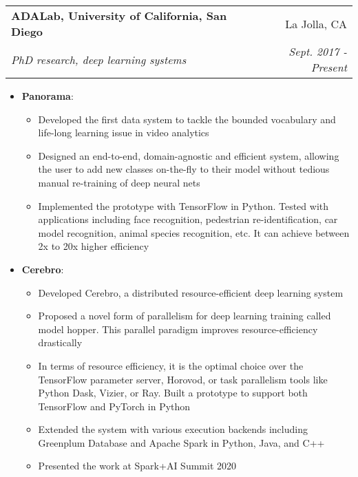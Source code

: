 \documentclass[letterpaper,11pt]{article}
\makeatletter
\newcommand{\resumeItem}[2]{
 \item\small{
  \textbf{#1}{: #2 \vspace{-2pt}}
 }
}
\newcommand{\resumeSubheading}[4]{
 \vspace{-1pt}\item
  \begin{tabular*}{0.97\textwidth}[t]{l@{\extracolsep{\fill}}r}
   \textbf{#1} & #2 \\
   \textit{\small#3} & \textit{\small #4}
  \end{tabular*}\vspace{-5pt}
}
\newcommand{\resumeItemListStart}{\begin{itemize}}
\newcommand{\resumeItemListEnd}{\end{itemize}\vspace{-5pt}}
\makeatother
\begin{document}
  \resumeSubheading
   {ADALab, University of California, San Diego}{La Jolla, CA}
   {PhD research, deep learning systems}{Sept. 2017 - Present}
   
   \resumeItemListStart
    \resumeItem{Panorama}
     {}
     {\small
      \begin{itemize}
         \item Developed the first data system to tackle the bounded vocabulary and life-long learning issue in video analytics \vspace{-2pt}
        	 \item Designed an end-to-end, domain-agnostic and efficient system, allowing the user to add new classes on-the-fly to their model without tedious manual re-training of deep neural nets \vspace{-2pt}
	     \item Implemented the prototype with TensorFlow in Python. Tested with applications including face recognition, pedestrian re-identification, car model recognition, animal species recognition, etc. It can achieve between 2x to 20x higher efficiency \vspace{-2pt}
      \end{itemize}
     }
     \resumeItem{Cerebro}
     {}
     {\small 
     \begin{itemize}
         \item Developed Cerebro, a distributed resource-efficient deep learning system \vspace{-2pt}
        	 \item Proposed a novel form of parallelism for deep learning training called model hopper. This parallel paradigm improves resource-efficiency drastically\vspace{-2pt}
	     \item In terms of resource efficiency, it is the optimal choice over the TensorFlow parameter server, Horovod, or task parallelism tools like Python Dask, Vizier, or Ray. Built a prototype to support both TensorFlow and PyTorch in Python\vspace{-2pt}
	     \item Extended the system with various execution backends including Greenplum Database and Apache Spark in Python, Java, and C++
	     \item Presented the work at Spark+AI Summit 2020
      \end{itemize}\vspace{-5pt}
      }
   \resumeItemListEnd
\end{document}
